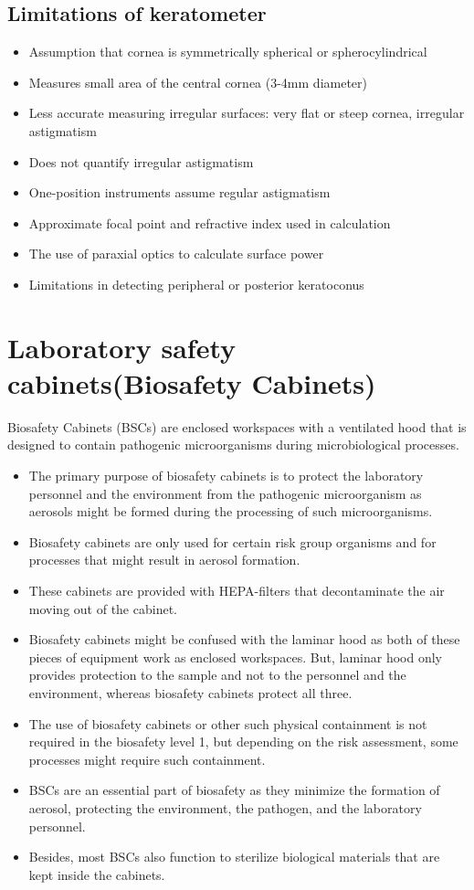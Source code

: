 \documentclass{article}
\begin{document}
\subsection{Limitations of keratometer}
\begin{itemize}
\item Assumption	that cornea	is	symmetrically spherical	or spherocylindrical
\item Measures small area	of	the	central	cornea	(3-4mm	diameter)
\item  Less accurate measuring irregular surfaces: very flat or steep cornea,	irregular	astigmatism
\item Does not quantify irregular astigmatism
\item One-position instruments assume	regular	astigmatism
\item Approximate	focal point and	refractive	index used in calculation
\item  The use of	paraxial optics	to calculate surface power
\item Limitations	in	detecting peripheral or	posterior keratoconus
\end{itemize}
\section{Laboratory safety cabinets(Biosafety Cabinets)}
Biosafety Cabinets (BSCs) are enclosed workspaces with a ventilated hood that is designed to contain pathogenic microorganisms during microbiological processes.
\begin{itemize}
\item The primary purpose of biosafety cabinets is to protect the laboratory personnel and the environment from the pathogenic microorganism as aerosols might be formed during the processing of such microorganisms.
\end{itemize}
\begin{itemize}
\item Biosafety cabinets are only used for certain risk group organisms and for processes that might result in aerosol formation.
\item These cabinets are provided with HEPA-filters that decontaminate the air moving out of the cabinet.
\item Biosafety cabinets might be confused with the laminar hood as both of these pieces of equipment work as enclosed workspaces. But, laminar hood only provides protection to the sample and not to the personnel and the environment, whereas biosafety cabinets protect all three.
\item The use of biosafety cabinets or other such physical containment is not required in the biosafety level 1, but depending on the risk assessment, some processes might require such containment.
\item BSCs are an essential part of biosafety as they minimize the formation of aerosol, protecting the environment, the pathogen, and the laboratory personnel.
\item Besides, most BSCs also function to sterilize biological materials that are kept inside the cabinets.
\end{itemize}
\end{document}
